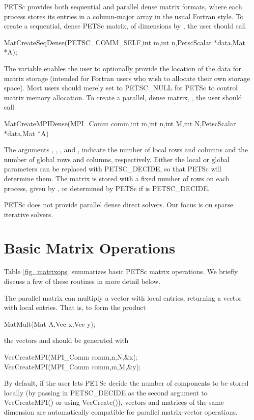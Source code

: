 PETSc provides both sequential and parallel dense matrix formats,
where each process stores its entries in a column-major array in the
usual Fortran style.  To create a sequential, dense PETSc matrix,
 of dimensions  by , the user should
call
\begin{tabbing}
  MatCreateSeqDense(PETSC_COMM_SELF,int m,int n,PetscScalar *data,Mat *A);
\end{tabbing}
The variable  enables the user to optionally provide the
location of the data for matrix storage (intended for Fortran users who
wish to allocate their own storage space).  Most users should merely
set  to PETSC_NULL for PETSc to control matrix memory allocation.
To create a parallel, dense matrix, , the user should call
\begin{tabbing}
  MatCreateMPIDense(MPI\_Comm comm,int m,int n,int M,int N,PetscScalar *data,Mat *A)
\end{tabbing}
The arguments , , 
, and , indicate the number of local rows and columns and
the number of global rows and columns, respectively. Either the local or
global parameters can be replaced with PETSC_DECIDE, so that 
PETSc will determine them.
The matrix is stored with a fixed number of rows on 
each process, given by , or determined by PETSc if  is
PETSC_DECIDE. 

PETSc does not provide parallel dense direct solvers. Our focus is on 
sparse iterative solvers.

\section{Basic Matrix Operations}
\label{sec_matoptions}

Table \ref{fig_matrixops} summarizes basic PETSc matrix operations.
We briefly discuss a few of these routines in more detail below.

The parallel matrix can multiply a vector with  
local entries, returning a vector with  local entries. That is, 
to form the product 
\begin{tabbing}
  MatMult(Mat A,Vec x,Vec y);
\end{tabbing}
the vectors  and  should be generated with 
\begin{tabbing}
  VecCreateMPI(MPI\_Comm comm,n,N,\&x);\\
  VecCreateMPI(MPI\_Comm comm,m,M,\&y);
\end{tabbing}
By default, if the user lets PETSc decide the number of components to
be stored locally (by passing in PETSC_DECIDE as the second
argument to VecCreateMPI() or using VecCreate()), vectors
and matrices of the same dimension are automatically compatible for
parallel matrix-vector operations.

